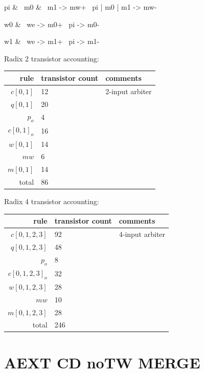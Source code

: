 \documentclass{article}
\begin{document}
\begin{prs2}
pi & ~m0 & ~m1 -> mw+
~pi | m0 | m1 -> mw-
\end{prs2}

\begin{prs2}
w0 & ~we -> m0+
~pi -> m0-

w1 & ~we -> m1+
~pi -> m1-
\end{prs2}

\noindent
Radix 2 transistor accounting:

\begin{center}
    \begin{tabular}{|r|l|l|}
    \hline
    rule & transistor count & comments \\ \hline
    $c[0,1]$ & 12 & 2-input arbiter \\ \hline
    $q[0,1]$ & 20 & \\ \hline
    $p_o$ & 4 & \\ \hline
    $c[0,1]_o$ & 16 & \\ \hline
    $w[0,1]$ & 14 & \\ \hline
    $mw$ & 6 & \\ \hline
    $m[0,1]$ & 14 & \\ \hline
    \hline total & 86 & \\ \hline
    \end{tabular}
\end{center}

\noindent
Radix 4 transistor accounting:

\begin{center}
    \begin{tabular}{|r|l|l|}
    \hline
    rule & transistor count & comments \\ \hline
    $c[0,1,2,3]$ & 92 & 4-input arbiter \\ \hline
    $q[0,1,2,3]$ & 48 & \\ \hline
    $p_o$ & 8 & \\ \hline
    $c[0,1,2,3]_o$ & 32 & \\ \hline
    $w[0,1,2,3]$ & 28 & \\ \hline
    $mw$ & 10 & \\ \hline
    $m[0,1,2,3]$ & 28 & \\ \hline
    \hline total & 246 & \\ \hline
    \end{tabular}
\end{center}

\section{AEXT CD noTW MERGE \label{sec:AEXT_CD_noTW_MERGE}}
\end{document}
